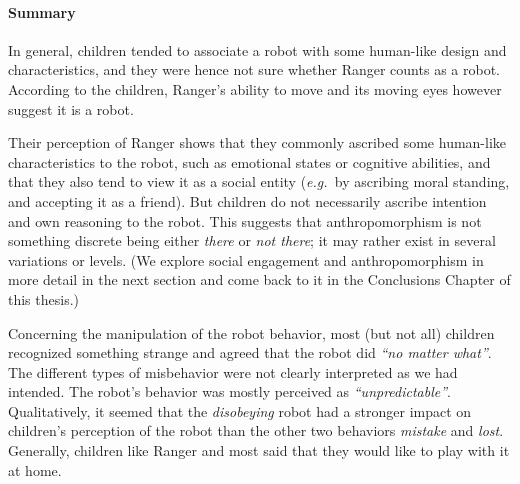 \documentclass{sig-alternate}
\newcommand{\eg}{{\textit{e.g.~}}}
\begin{document}
	


\paragraph{Summary}

In general, children tended to associate a robot with some human-like design and
characteristics, and they were hence not sure whether Ranger counts as a robot.
According to the children, Ranger's ability to move and its moving eyes however
suggest it is a robot.

Their perception of Ranger shows that they commonly ascribed some human-like
characteristics to the robot, such as emotional states or cognitive abilities,
and that they also tend to view it as a social entity (\eg by ascribing moral
standing, and accepting it as a friend). But children do not necessarily ascribe
intention and own reasoning to the robot. This suggests that anthropomorphism is
not something discrete being either \textit{there} or \textit{not there}; it may
rather exist in several variations or levels. (We explore social engagement and
anthropomorphism in more detail in the next section and come back to it in the
Conclusions Chapter of this thesis.) 

Concerning the manipulation of the robot behavior, most (but not all) children
recognized something strange and agreed that the robot did \textit{``no matter
what''}. The different types of misbehavior were not clearly interpreted as we
had intended. The robot's behavior was mostly perceived as
\textit{``unpredictable''}. Qualitatively, it seemed that the
\textit{disobeying} robot had a stronger impact on children's perception of the
robot than the other two behaviors \textit{mistake} and \textit{lost}.
Generally, children like Ranger and most said that they would like to play with
it at home.\\


\end{document}
